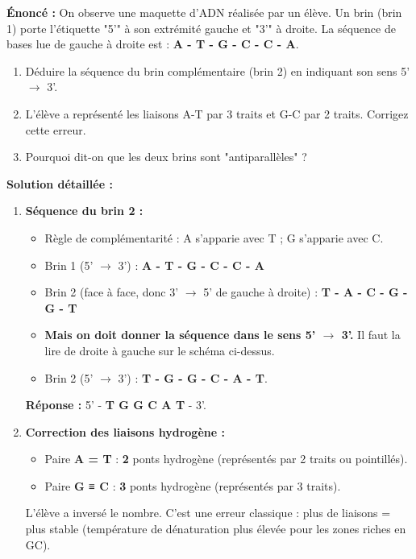 \documentclass[11pt]{article}
\begin{document}
\begin{exoresolu}
    \textbf{Énoncé :} On observe une maquette d'ADN réalisée par un élève. Un brin (brin 1) porte l'étiquette "5'" à son extrémité gauche et "3'" à droite. La séquence de bases lue de gauche à droite est : \textbf{A - T - G - C - C - A}.
    \begin{enumerate}
        \item Déduire la séquence du brin complémentaire (brin 2) en indiquant son sens 5' $\rightarrow$ 3'.
        \item L'élève a représenté les liaisons A-T par 3 traits et G-C par 2 traits. Corrigez cette erreur.
        \item Pourquoi dit-on que les deux brins sont "antiparallèles" ?
    \end{enumerate}
    \tcblower
    \textbf{Solution détaillée :}
    \begin{enumerate}
        \item \textbf{Séquence du brin 2 :}
            \begin{itemize}
                \item Règle de complémentarité : A s'apparie avec T ; G s'apparie avec C.
                \item Brin 1 (5' $\rightarrow$ 3') : \textbf{A - T - G - C - C - A}
                \item Brin 2 (face à face, donc 3' $\rightarrow$ 5' de gauche à droite) : \textbf{T - A - C - G - G - T}
                \item \textbf{Mais on doit donner la séquence dans le sens 5' $\rightarrow$ 3'.} Il faut la lire de droite à gauche sur le schéma ci-dessus.
                \item Brin 2 (5' $\rightarrow$ 3') : \textbf{T - G - G - C - A - T}.
            \end{itemize}
            \textbf{Réponse :} 5' - \textbf{T G G C A T} - 3'.
        \item \textbf{Correction des liaisons hydrogène :}
            \begin{itemize}
                \item Paire \textbf{A = T} : \textbf{2} ponts hydrogène (représentés par 2 traits ou pointillés).
                \item Paire \textbf{G ≡ C} : \textbf{3} ponts hydrogène (représentés par 3 traits).
            \end{itemize}
            L'élève a inversé le nombre. C'est une erreur classique : plus de liaisons = plus stable (température de dénaturation plus élevée pour les zones riches en GC).

\end{enumerate}
\end{exoresolu}
\end{document}
